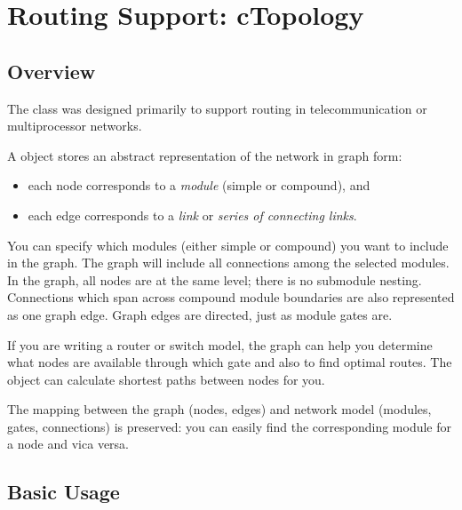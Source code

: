 

\section{Routing Support: cTopology}

\subsection{Overview}

The  class was designed primarily to support
routing in telecommunication or multiprocessor
networks.

A  object stores an abstract representation of the
network in graph form:
\begin{itemize}
  \item{each  node corresponds to a \textit{module}
    (simple or compound), and}
  \item{each  edge corresponds to a \textit{link} or
    \textit{series of connecting links}.}
\end{itemize}

You can specify which modules (either simple or compound) you want to
include in the graph. The graph will include all connections among the
selected modules. In the graph, all nodes are at the same level;
there is no submodule nesting.  Connections which span across compound
module boundaries are also represented as one graph edge. Graph edges
are directed, just as module gates are.


If you are writing a router or switch model, the 
graph can help you determine what nodes are available through which
gate and also to find optimal routes. The
 object can calculate shortest paths between nodes for you.

The mapping between the graph (nodes, edges) and network model
(modules, gates, connections) is preserved: you can easily find
the corresponding module for a  node and vica versa.





\subsection{Basic Usage}

